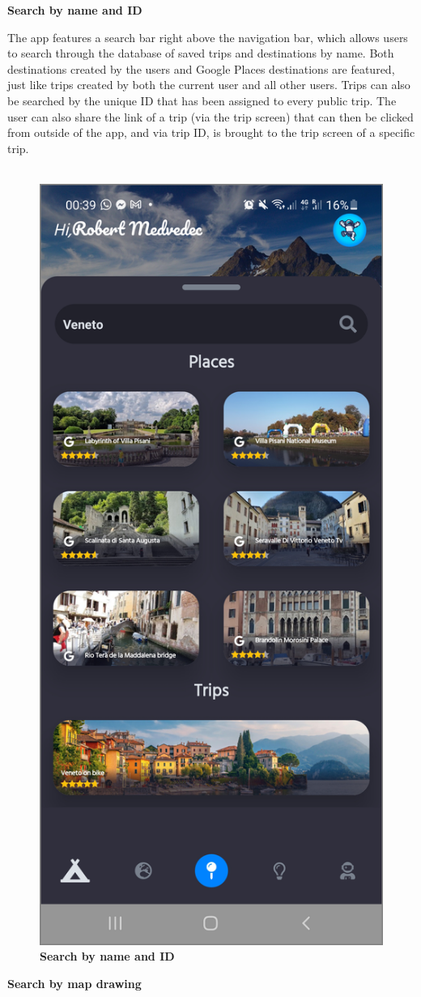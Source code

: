 \textbf{Search by name and ID}

The app features a search bar right above the navigation bar, which allows users to search through the database of saved trips and destinations by name. Both destinations created by the users and Google Places destinations are featured, just like trips created by both the current user and all other users. Trips can also be searched by the unique ID that has been assigned to every public trip. The user can also share the link of a trip (via the trip screen) that can then be clicked from outside of the app, and via trip ID, is brought to the trip screen of a specific trip.\\ \\
\begin{figure}[!htb]
\centering
\includegraphics[width=.35\textwidth]{../Images/UI/SearchName.jpg}
\caption{\label{fig:dbapiuser}\textbf{Search by name and ID}}
\end{figure}
\newpage

\textbf{Search by map drawing}

